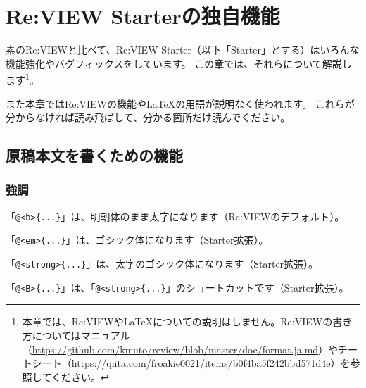 \chapter{Re:VIEW Starterの独自機能}
\label{chap:chap01-starter}
\begin{starterabstract}
素のRe:VIEWと比べて、Re:VIEW Starter（以下「Starter」とする）はいろんな機能強化やバグフィックスをしています。
この章では、それらについて解説します\footnote{本章では、Re:VIEWや\LaTeX{}についての説明はしません。Re:VIEWの書き方についてはマニュアル（\url{https://github.com/kmuto/review/blob/master/doc/format.ja.md}）やチートシート（\url{https://qiita.com/froakie0021/items/b0f4ba5f242bbd571d4e}）を参照してください。}。

また本章ではRe:VIEWの機能や\LaTeX{}の用語が説明なく使われます。
これらが分からなければ読み飛ばして、分かる箇所だけ読んでください。
\end{starterabstract}

\section{原稿本文を書くための機能}
\label{sec:1-1}
\label{sec-ext}

\subsection*{強調}
\label{sec:1-1-1}

\begin{starteritemize}
\item 「\texttt{@\textless{}b\textgreater{}\{...\}}」は、明朝体のまま太字になります（Re:VIEWのデフォルト）。
\item 「\texttt{@\textless{}em\textgreater{}\{...\}}」は、ゴシック体になります（Starter拡張）。
\item 「\texttt{@\textless{}strong\textgreater{}\{...\}}」は、太字のゴシック体になります（Starter拡張）。
\item 「\texttt{@\textless{}B\textgreater{}\{...\}}」は、「\texttt{@\textless{}strong\textgreater{}\{...\}}」のショートカットです（Starter拡張）。
\end{starteritemize}

\begin{starterprogram}\end{starterprogram}
\noindent
{}

